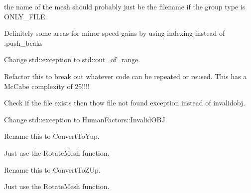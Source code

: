
\begin{DoxyRefList}
\item[Member \mbox{\hyperlink{a00403_a06c0c11adb62f8b204e42f75ac1990ac}{HF::Geometry::Load\+Mesh\+Objects}} (std\+::string path, G\+R\+O\+U\+P\+\_\+\+M\+E\+T\+H\+OD gm=O\+N\+L\+Y\+\_\+\+F\+I\+LE, bool change\+\_\+coords=false, int scale=1)]\label{a00386__todo000014}%
%
the name of the mesh should probably just be the filename if the group type is O\+N\+L\+Y\+\_\+\+F\+I\+LE. 

Definitely some areas for minor speed gains by using indexing instead of .push\+\_\+bcaks 

Change std\+::exception to std\+::out\+\_\+of\+\_\+range. 

Refactor this to break out whatever code can be repeated or reused. This has a Mc\+Cabe complexity of 25!!!! 
\item[Member \mbox{\hyperlink{a00403_aec1df746155d224838048d3a43c2fe96}{HF::Geometry::Load\+Raw\+Vertices}} (std\+::string path)]\label{a00386__todo000015}%
%
Check if the file exists then thow file not found exception instead of invalidobj. 
\item[Member \mbox{\hyperlink{a01297_a1ff7bb434d74d25722cc3ab7e6ca3997}{HF::Geometry::Mesh\+Info$<$ numeric\+\_\+type $>$::Add\+Verts}} (const std\+::vector$<$ std\+::array$<$ numeric\+\_\+type, 3 $>$$>$ \&verts)]\label{a00386__todo000009}%
%
Change std\+::exception to Human\+Factors\+::\+Invalid\+O\+BJ.  
\item[Member \mbox{\hyperlink{a01297_a5f067dbc661b07c1762b402da03f2041}{HF::Geometry::Mesh\+Info$<$ numeric\+\_\+type $>$::Convert\+To\+O\+B\+J\+Coordinates}} ()]\label{a00386__todo000011}%
%
Rename this to Convert\+To\+Yup. 

Just use the Rotate\+Mesh function. 
\item[Member \mbox{\hyperlink{a01297_af1152233ddbd8fac736f761347e6d3b8}{HF::Geometry::Mesh\+Info$<$ numeric\+\_\+type $>$::Convert\+To\+Rhino\+Coordinates}} ()]\label{a00386__todo000010}%
%
Rename this to Convert\+To\+Z\+Up. 

Just use the Rotate\+Mesh function. 


\end{DoxyRefList}
